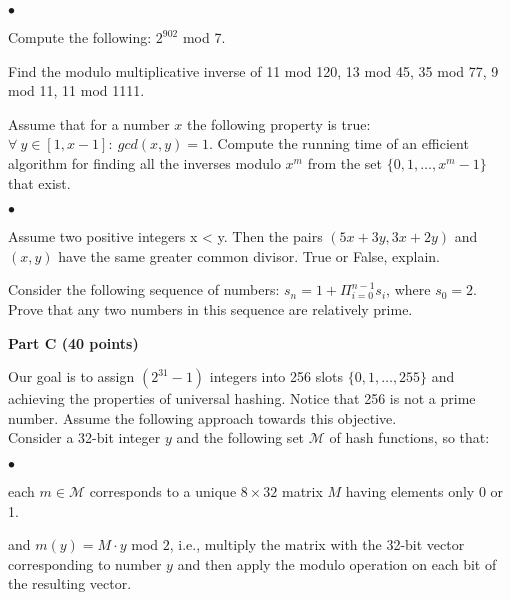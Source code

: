 \documentclass{article}
\newenvironment{myitem}{\begin{list}{$\bullet$}
{\setlength{\itemsep}{-0pt}
\setlength{\topsep}{0pt}
\setlength{\labelwidth}{0pt}
\setlength{\leftmargin}{10pt}
\setlength{\parsep}{-0pt}
\setlength{\itemsep}{0pt}
\setlength{\partopsep}{0pt}}}%
{\end{list}}
\begin{document}
\begin{myitem}
\item Compute the following: $2^{902}$ mod 7.\\
\item Find the modulo multiplicative inverse of 11 mod 120, 13 mod 45,
  35 mod 77, 9 mod 11, 11 mod 1111.\\
\item Assume that for a number $x$ the following property is true:
  $\forall\ y \in [1,x-1]:\ gcd(x,y) = 1$. Compute the running time of
  an efficient algorithm for finding all the inverses modulo $x^m$
  from the set $\{0, 1, \ldots, x^m-1\}$ that exist.\\
\end{myitem}

\begin{myitem}
\item Assume two positive integers x < y. Then the pairs
  $(5x+3y,3x+2y)$ and $(x,y)$ have the same greater common
  divisor. True or False, explain.\\

\item Consider the following sequence of numbers: $s_n = 1 +
  \Pi_{i=0}^{n-1} s_i$, where $s_0 = 2$. Prove that any two numbers in
  this sequence are relatively prime.\\
\end{myitem}

\begin{center}
{\bf Part C (40 points)}
\end{center}

 Our goal is to assign $(2^{31}-1)$ integers
into 256 slots $\{0,1, \dots, 255\}$ and achieving the properties of
universal hashing. Notice that 256 is not a prime number. Assume the
following approach towards this objective.\\

\noindent Consider a 32-bit integer $y$ and the following set $\mathcal{M}$ of
hash functions, so that:
\begin{myitem}
\item each $m \in \mathcal{M}$ corresponds to a unique $8 \times 32$
  matrix $M$ having elements only 0 or 1.
\item and $m(y) = M \cdot y$ mod $2$, i.e., multiply the matrix with
  the 32-bit vector corresponding to number $y$ and then apply the
  modulo operation on each bit of the resulting vector.\\
\end{myitem}
\end{document}
